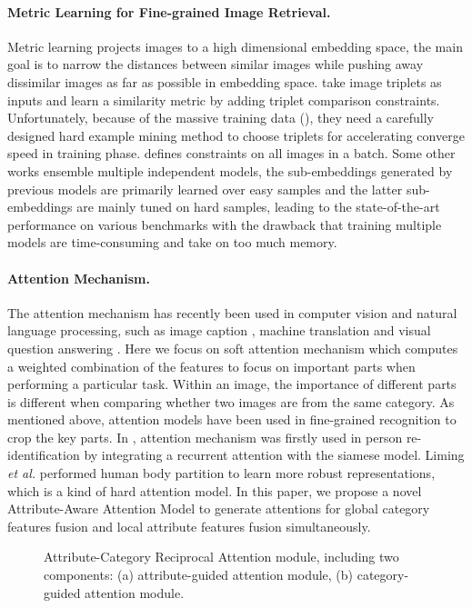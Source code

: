 \documentclass[sigconf]{acmart}
\begin{document}
\paragraph{Metric Learning for Fine-grained Image Retrieval.} Metric learning projects images to a high dimensional embedding space, the main goal is to narrow the distances between similar images while pushing away dissimilar images as far as possible in embedding space. \cite{Cui2016Fine, mining} take image  triplets as inputs and learn a similarity metric by adding triplet comparison constraints. Unfortunately, because of the massive training data (), they need a carefully designed hard example mining method to choose triplets for accelerating converge speed in training phase. \cite{npair} defines constraints on all images in a batch. Some other works \cite{bier, hdc} ensemble multiple independent models, the sub-embeddings generated by previous models are primarily learned over easy samples and the latter sub-embeddings are mainly tuned on hard samples, leading to the state-of-the-art performance on various benchmarks with the drawback that training multiple models are time-consuming and take on too much memory.

\paragraph{Attention Mechanism.} The attention mechanism has recently been used in computer vision and natural language processing, such as image caption \cite{xu2015show}, machine translation \cite{bahdanau2014neural} and visual question answering \cite{xu2016ask,yang2016stacked}. Here we focus on soft attention mechanism which computes a weighted combination of the features to focus on important parts when performing a particular task. Within an image, the importance of different parts is different when comparing whether two images are from the same category. As mentioned above, attention models have been used in fine-grained recognition to crop the key parts. In \cite{liu2017end}, attention mechanism was firstly used in person re-identification by integrating a recurrent attention with the siamese model. Liming \emph{et al.} \cite{Zhao2017Deeply} performed human body partition to learn more robust representations, which is a kind of hard attention model. In this paper, we propose a novel Attribute-Aware Attention Model to generate attentions for global category features fusion and local attribute features fusion simultaneously.

\begin{figure}[!htb]
\centering
{}
\caption{Attribute-Category Reciprocal Attention module, including two components: (a) attribute-guided attention module, (b) category-guided attention module.}
\label{fig:attention}
\end{figure}
\end{document}
